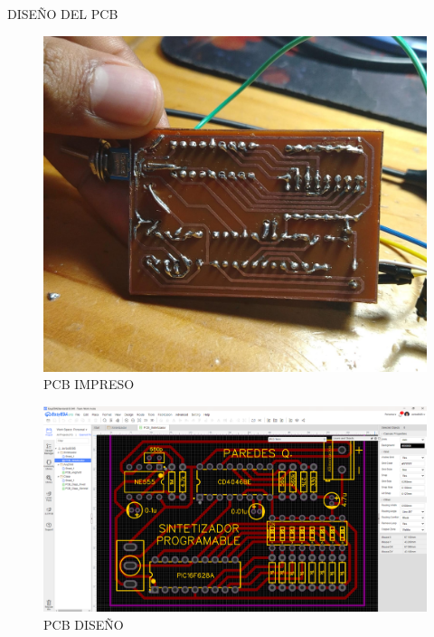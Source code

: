DISEÑO DEL PCB
\begin{figure}[H]
    \centering
    \includegraphics[width=.7\textwidth]{imgs/ANEXO PCB.jpg}
    \caption{PCB IMPRESO}
\end{figure}
\begin{figure}[H]
    \centering
    \includegraphics[width=.7\textwidth]{imgs/ANEXO PCB 2.png}
    \caption{PCB DISEÑO}
\end{figure}